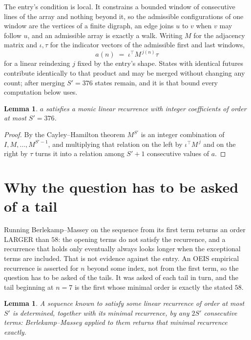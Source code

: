 \documentclass[11pt,a4paper]{article}
\theoremstyle{plain}
\newtheorem{lemma}[theorem]{Lemma}
\theoremstyle{definition}
\begin{document}
The entry's condition is local. It constrains a bounded window of consecutive lines of the
array and nothing beyond it, so the admissible configurations of one window are the vertices of
a finite digraph, an edge joins $u$ to $v$ when $v$ may follow $u$, and an admissible array is
exactly a walk. Writing $M$ for the adjacency matrix and $\iota,\tau$ for the indicator vectors
of the admissible first and last windows,
\[
a(n)\;=\;\iota^{\!\top}M^{\,j(n)}\tau
\]
for a linear reindexing $j$ fixed by the entry's shape. States with identical futures
contribute identically to that product and may be merged without changing any count; after
merging $S'=376$ states remain, and it is that bound every computation below uses.

\begin{lemma}\label{lem:cf}
$a$ satisfies a monic linear recurrence with integer coefficients of order at most $S'=376$.
\end{lemma}

\begin{proof}
By the Cayley--Hamilton theorem $M^{S'}$ is an integer combination of $I,M,\dots,M^{S'-1}$,
and multiplying that relation on the left by $\iota^{\!\top}M^{\,j}$ and on the right by
$\tau$ turns it into a relation among $S'+1$ consecutive values of $a$.
\end{proof}

\section{Why the question has to be asked of a tail}

Running Berlekamp--Massey on the sequence from its first term returns an order LARGER than $58$: the opening terms do not satisfy the recurrence, and a recurrence that holds only eventually always looks longer when the exceptional terms are included. That is not evidence against the entry. An OEIS empirical recurrence is asserted for $n$ beyond some index, not from the first term, so the question has to be asked of the tails. It was asked of each tail in turn, and the tail beginning at $n=7$ is the first whose minimal order is exactly the stated $58$.

\begin{lemma}\label{lem:bm}
A sequence known to satisfy some linear recurrence of order at most $S'$ is determined,
together with its minimal recurrence, by any $2S'$ consecutive terms: Berlekamp--Massey applied
to them returns that minimal recurrence exactly.
\end{lemma}
\end{document}
